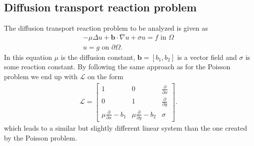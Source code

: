 \subsection{Diffusion transport reaction problem}
%
The diffusion transport reaction problem to be analyzed is given as 
\begin{align}
	-\mu \Delta u + \mathbf{b} \cdot \nabla u +\sigma u = f \text{ in } \Omega \\
	u = g \text{ on } \partial \Omega.
	\label{eq:DiffTrans}
\end{align}
In this equation $\mu$ is the diffusion constant, $\mathbf{b} = [b_1 , b_2]$ is a vector field and $\sigma$ is some reaction constant. By following the same approach as for the Poisson problem we end up with $\mathcal{L}$ on the form
\begin{align}
	\mathcal{L} =
	\begin{bmatrix}
		1 & 0 & \frac{\partial} {\partial x}  \\
		0 & 1 & \frac{\partial} {\partial y}  \\
		\mu \frac{\partial} {\partial x} - b_1 & \mu \frac{\partial} {\partial y} -b_2 & \sigma
	\end{bmatrix}.
	\label{eq:AmatrixDiff}
\end{align}
which leads to a similar but slightly different linear system than the one created by the Poisson problem.



